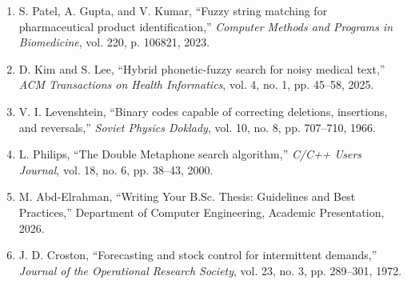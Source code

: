 \documentclass[12pt,a4paper,oneside]{report}
\begin{document}
\begin{enumerate}
\item
  S. Patel, A. Gupta, and V. Kumar, ``Fuzzy string matching for pharmaceutical product identification,'' \emph{Computer Methods and Programs in Biomedicine}, vol. 220, p. 106821, 2023.
\item
  D. Kim and S. Lee, ``Hybrid phonetic-fuzzy search for noisy medical text,'' \emph{ACM Transactions on Health Informatics}, vol. 4, no. 1, pp. 45--58, 2025.
\item
  V. I. Levenshtein, ``Binary codes capable of correcting deletions, insertions, and reversals,'' \emph{Soviet Physics Doklady}, vol. 10, no. 8, pp. 707--710, 1966.
\item
  L. Philips, ``The Double Metaphone search algorithm,'' \emph{C/C++ Users Journal}, vol. 18, no. 6, pp. 38--43, 2000.
\item
  M. Abd-Elrahman, ``Writing Your B.Sc. Thesis: Guidelines and Best Practices,'' Department of Computer Engineering, Academic Presentation, 2026.
\item
  J. D. Croston, ``Forecasting and stock control for intermittent demands,'' \emph{Journal of the Operational Research Society}, vol. 23, no. 3, pp. 289--301, 1972.
\end{enumerate}
\end{document}
